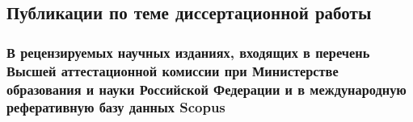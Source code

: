 \subsection*{Публикации по теме диссертационной работы}

\subsubsection*{В рецензируемых научных изданиях, входящих в перечень Высшей аттестационной комиссии при Министерстве образования и науки Российской Федерации и в международную реферативную базу данных Scopus}%


\renewcommand{\baselinestretch}{1.5}
\renewcommand{\arraystretch}{1.5}

